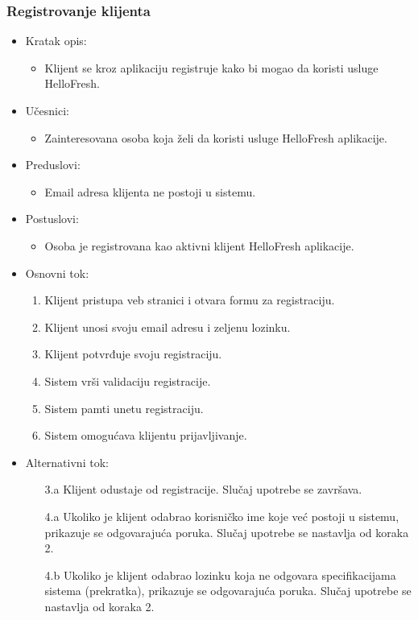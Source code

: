 \subsubsection{Registrovanje klijenta}

\begin{itemize}
    \item Kratak opis:
        \begin{itemize}
            \item Klijent se kroz aplikaciju registruje kako bi mogao da koristi usluge HelloFresh.
        \end{itemize}
    \item Učesnici:
        \begin{itemize}
            \item Zainteresovana osoba koja želi da koristi usluge HelloFresh aplikacije.
        \end{itemize}
    \item Preduslovi:
        \begin{itemize}
            \item Email adresa klijenta ne postoji u sistemu.
        \end{itemize}
    \item Postuslovi:
        \begin{itemize}
            \item Osoba je registrovana kao aktivni klijent HelloFresh aplikacije.
        \end{itemize}
    \item Osnovni tok:
        \begin{enumerate}
            \item Klijent pristupa veb stranici i otvara formu za registraciju.
            \item Klijent unosi svoju email adresu i zeljenu lozinku.
            \item Klijent potvrđuje svoju registraciju.
            \item Sistem vrši validaciju registracije.
            \item Sistem pamti unetu registraciju.
            \item Sistem omogućava klijentu prijavljivanje.
        \end{enumerate}
    \item Alternativni tok:
        \begin{itemize}
            \item[3.a] Klijent odustaje od registracije. Slučaj upotrebe se završava.
            \item[4.a] Ukoliko je klijent odabrao korisničko ime koje već postoji u sistemu, prikazuje se odgovarajuća poruka. Slučaj upotrebe se nastavlja od koraka 2.
            \item[4.b] Ukoliko je klijent odabrao lozinku koja ne odgovara specifikacijama sistema (prekratka), prikazuje se odgovarajuća poruka. Slučaj upotrebe se nastavlja od koraka 2.
        \end{itemize}
\end{itemize}

